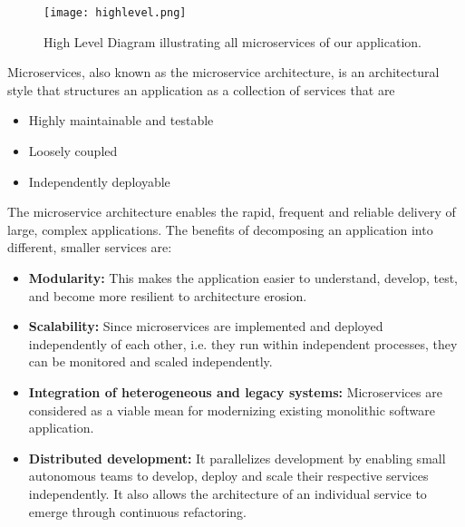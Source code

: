 \begin{figure}[h]
    \centering
    \texttt{[image: highlevel.png]}
    \caption{High Level Diagram illustrating all microservices of our application.}
    \label{fig:highlevel}
\end{figure}

Microservices, also known as the microservice architecture, is an architectural style that structures an 
application as a collection of services that are
\begin{itemize}
    \item Highly maintainable and testable
    \item Loosely coupled
    \item Independently deployable
\end{itemize}

The microservice architecture enables the rapid, frequent and reliable delivery of large, complex applications.
The benefits of decomposing an application into different, smaller services are:
\begin{itemize}
    \item \textbf{Modularity:} This makes the application easier to understand, develop, test, and 
    become more resilient to architecture erosion.
    \item \textbf{Scalability:} Since microservices are implemented and deployed independently of 
    each other, i.e. they run within independent processes, they can be monitored and scaled independently.
    \item \textbf{Integration of heterogeneous and legacy systems:} Microservices are considered as a 
    viable mean for modernizing existing monolithic software application.
    \item \textbf{Distributed development:} It parallelizes development by enabling small autonomous teams to
    develop, deploy and scale their respective services independently. It also allows the architecture of 
    an individual service to emerge through continuous refactoring.
\end{itemize}

